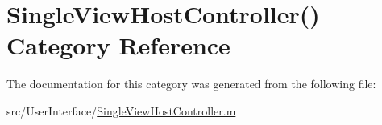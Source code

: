 \hypertarget{category_single_view_host_controller_07_08}{\section{Single\-View\-Host\-Controller() Category Reference}
\label{category_single_view_host_controller_07_08}
}


The documentation for this category was generated from the following file\-:\begin{DoxyCompactItemize}
\item 
src/\-User\-Interface/\hyperlink{_single_view_host_controller_8m}{Single\-View\-Host\-Controller.\-m}\end{DoxyCompactItemize}
